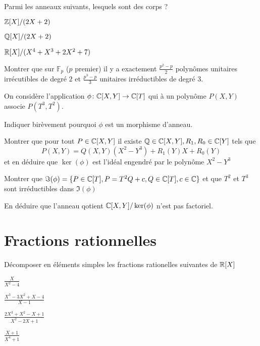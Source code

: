 \documentclass[french]{report}
\begin{document}
\begin{exo}
    Parmi les anneaux suivants, lesquels sont des corps ?
    \begin{q}{1}
        \(\mathbb{Z}[X]/(2X+2)\)
    \end{q}
    \begin{q}{2}
        \(\mathbb{Q}[X]/(2X+2)\)
    \end{q}
    \begin{q}{3}
        \(\mathbb{R}[X]/(X^4+X^3+2X^2+7)\)
    \end{q}
\end{exo}

\begin{exo}
    Montrer que sur \(\mathbb{F}_p\) (\(p\) premier) il y a exactement \(\frac{p^2-p}{2}\)
    polynômes unitaires irrécutibles de degré \(2\) et \(\frac{p^3-p}{3}\) unitaires
    irréductibles de degré \(3\).
\end{exo}

\begin{exo}
    On considère l'application \(\phi\colon\mathbb{C}[X,Y]\to\mathbb{C}[T]\) qui à un polynôme
    \(P(X,Y)\) associe \(P(T^3,T^2)\).
    \begin{q}{1}
        Indiquer birèvement pourquoi \(\phi\) est un morphisme d'anneau.
    \end{q}
    \begin{q}{2}
        Montrer que pour tout \(P\in\mathbb{C}[X,Y]\) il existe \(\mathbb{Q}\in\mathbb{C}[X,Y],R_1,R_0\in\mathbb{C}[Y]\)
        tels que \[P(X,Y)=Q(X,Y)(X^2-Y^3)+R_1(Y)X+R_0(Y)\] et en déduire que \(\ker(\phi)\)
        est l'idéal engendré par le polynôme \(X^2-Y^3\)
    \end{q}
    \begin{q}{3}
        Montrer que \(\Im(\phi)=\{P\in\mathbb{C}[T],P=T^2Q+c,Q\in\mathbb{C}[T],c\in\mathbb{C}\}\) et que \(T^2\)
        et \(T^3\) sont irréductibles dans \(\Im(\phi)\)
    \end{q}
    \begin{q}{4}
        En déduire que l'anneau qotient \(\mathbb{C}[X,Y]/\ker(\phi)\) n'est pas factoriel.
    \end{q}
\end{exo}

\section*{Fractions rationnelles}

\begin{exo}
    Décomposer en éléments simples les fractions rationelles suivantes de \(\mathbb{R}[X]\)
    \begin{q}{1}
        \(\frac{X}{X^2-4}\)
    \end{q}
    \begin{q}{2}
        \(\frac{X^3-3X^2+X-4}{X-1}\)
    \end{q}
    \begin{q}{3}
        \(\frac{2X^3+X^2-X+1}{X^2-2X+1}\)
    \end{q}
    \begin{q}{4}
        \(\frac{X+1}{X^4+1}\)
    \end{q}
\end{exo}
\end{document}
